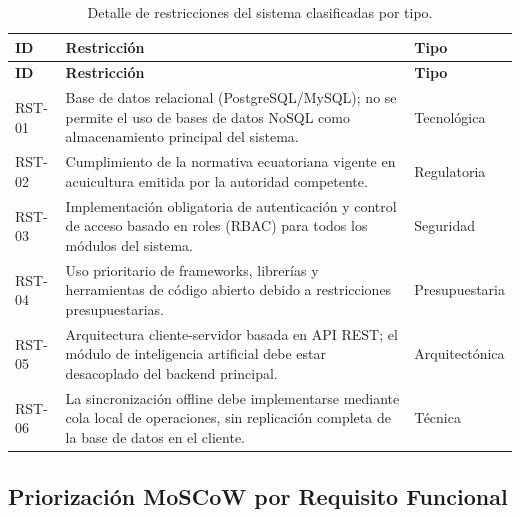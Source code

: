 \documentclass[11pt,a4paper]{article}
\begin{document}
\begin{longtable}{|p{2.5cm}|p{9cm}|p{3.5cm}|}
\caption{Detalle de restricciones del sistema clasificadas por tipo.}
\label{tab:restricciones-clasificadas} \\
\hline

\textbf{ID} & \textbf{Restricción} & \textbf{Tipo} \\
\hline

\endfirsthead

\hline
\textbf{ID} & \textbf{Restricción} & \textbf{Tipo} \\
\hline
\endhead

\hline
\endfoot

\hline
\endlastfoot

RST-01 & Base de datos relacional (PostgreSQL/MySQL); no se permite el uso de bases de datos NoSQL como almacenamiento principal del sistema. & Tecnológica \\
\hline

RST-02 & Cumplimiento de la normativa ecuatoriana vigente en acuicultura emitida por la autoridad competente. & Regulatoria \\
\hline

RST-03 & Implementación obligatoria de autenticación y control de acceso basado en roles (RBAC) para todos los módulos del sistema. & Seguridad \\
\hline

RST-04 & Uso prioritario de frameworks, librerías y herramientas de código abierto debido a restricciones presupuestarias. & Presupuestaria \\
\hline

RST-05 & Arquitectura cliente-servidor basada en API REST; el módulo de inteligencia artificial debe estar desacoplado del backend principal. & Arquitectónica \\
\hline

RST-06 & La sincronización offline debe implementarse mediante cola local de operaciones, sin replicación completa de la base de datos en el cliente. & Técnica \\
\hline

\end{longtable}

\subsection{Priorización MoSCoW por Requisito Funcional}
\end{document}
